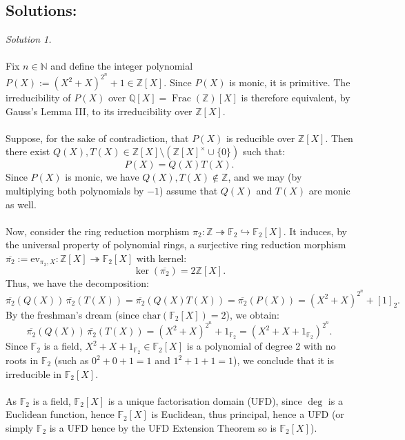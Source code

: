 \documentclass[11pt, a4paper, oneside]{article}
\newcommand{\solution}[1][]{\subsection*{#1}\hfill \par}
\theoremstyle{remark}
\theoremstyle{lemma}
\begin{document}
\solution[Solutions:]
\textit{Solution 1.}
\\\\
Fix \( n \in \mathbb{N} \) and define the integer polynomial \( P(X) := \left( X^2 + X \right)^{2^n} + 1 \in \mathbb{Z}[X] \). Since \( P(X) \) is monic, it is primitive. The irreducibility of \( P(X) \) over \( \mathbb{Q}[X] = \operatorname{Frac}\left( \mathbb{Z} \right)[X] \) is therefore equivalent, by Gauss’s Lemma III, to its irreducibility over \( \mathbb{Z}[X] \).
\\\\
Suppose, for the sake of contradiction, that \( P(X) \) is reducible over \( \mathbb{Z}[X] \). Then there exist \( Q(X), T(X) \in \mathbb{Z}[X]\setminus\left(\mathbb{Z}[X]^{\times}\cup \{0\}\right)\) such that:
\[
P(X) = Q(X)T(X).
\]
Since \( P(X) \) is monic, we have \( Q(X), T(X) \notin \mathbb{Z} \), and we may (by multiplying both polynomials by \( -1 \)) assume that \( Q(X) \) and \( T(X) \) are monic as well.
\\\\
Now, consider the ring reduction morphism \( \pi_2 : \mathbb{Z} \twoheadrightarrow \mathbb{F}_2 \hookrightarrow \mathbb{F}_2[X] \). It induces, by the universal property of polynomial rings, a surjective ring reduction morphism \( \overline{\pi_2} := \mathrm{ev}_{\pi_2, X} : \mathbb{Z}[X] \twoheadrightarrow \mathbb{F}_2[X] \) with kernel:
\begin{equation}
\label{4.1}
\tag{1}
\ker \left( \overline{\pi_2} \right) = 2\mathbb{Z}[X].
\end{equation}
Thus, we have the decomposition:
\[
\overline{\pi_2}(Q(X)) \, \overline{\pi_2}(T(X)) = \overline{\pi_2}(Q(X)T(X)) = \overline{\pi_2}(P(X)) = \left( X^2 + X \right)^{2^n} + [1]_2.
\]
By the freshman’s dream (since \( \mathrm{char}(\mathbb{F}_2[X]) = 2 \)), we obtain:
\[
\overline{\pi_2}(Q(X)) \, \overline{\pi_2}(T(X)) = \left( X^2 + X \right)^{2^n} + 1_{\mathbb{F}_2} = \left( X^2 + X + 1_{\mathbb{F}_2} \right)^{2^n}.
\]
Since \( \mathbb{F}_2 \) is a field,  \( X^2 + X + 1_{\mathbb{F}_2} \in \mathbb{F}_2[X] \) is a polynomial of degree 2 with no roots in \( \mathbb{F}_2 \) (such as \( 0^2 + 0 + 1 = 1 \) and \( 1^2 + 1 + 1 = 1 \)), we conclude that it is irreducible in \( \mathbb{F}_2[X] \).
\\\\
As \( \mathbb{F}_2 \) is a field, \( \mathbb{F}_2[X] \) is a unique factorisation domain (UFD), since \( \deg \) is a Euclidean function, hence \( \mathbb{F}_2[X] \) is Euclidean, thus principal, hence a UFD (or simply \(\mathbb{F}_2\) is a UFD hence by the UFD Extension Theorem so is \(\mathbb{F}_2[X]\)).
\end{document}

